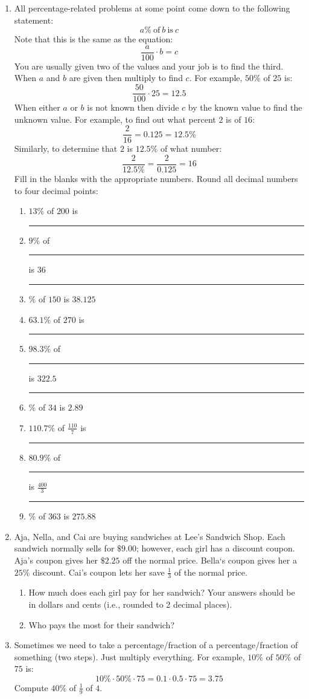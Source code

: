 \documentclass[letterpaper,12pt,fleqn]{article}
\begin{document}
\begin{enumerate}
\item All percentage-related problems at some point come down to the following
  statement:
  \[a\%\ \mbox{of}\ b\ \mbox{is}\ c\]
  Note that this is the same as the equation:
  \[\frac{a}{100}\cdot b=c\]
  You are usually given two of the values and your job is to find the third.
  When $a$ and $b$ are given then multiply to find $c$. For example, $50\%$ of
  $25$ is:
  \[\frac{50}{100}\cdot25=12.5\]
  When either $a$ or $b$ is not known then divide $c$ by the known value to find
  the unknown value. For example, to find out what percent $2$ is of $16$:
  \[\frac{2}{16}=0.125=12.5\%\]
  Similarly, to determine that $2$ is $12.5\%$ of what number:
  \[\frac{2}{12.5\%}=\frac{2}{0.125}=16\]
  Fill in the blanks with the appropriate numbers. Round all decimal numbers to
  four decimal points:
  \begin{enumerate}
  \item $13\%$ of $200$ is \rule{1in}{0.1mm}
  \item $9\%$ of \rule{1in}{0.1mm} is $36$
  \item \rule{1in}{0.1mm}$\%$ of $150$ is $38.125$
  \item $63.1\%$ of $270$ is \rule{1in}{0.1mm}
  \item $98.3\%$ of \rule{1in}{0.1mm} is $322.5$
  \item \rule{1in}{0.1mm}$\%$ of $34$ is $2.89$
  \item $110.7\%$ of $\frac{110}{7}$ is \rule{1in}{0.1mm}
  \item $80.9\%$ of \rule{1in}{0.1mm} is $\frac{400}{3}$
  \item \rule{1in}{0.1mm}$\%$ of $363$ is $275.88$
  \end{enumerate}

\item Aja, Nella, and Cai are buying sandwiches at Lee's Sandwich Shop. Each
  sandwich normally sells for $\$9.00$; however, each girl has a discount
  coupon. Aja's coupon gives her $\$2.25$ off the normal price. Bella`s coupon
  gives her a $25\%$ discount. Cai's coupon lets her save $\frac{1}{3}$ of the
  normal price.
  \begin{enumerate}
  \item How much does each girl pay for her sandwich? Your answers should be
    in dollars and cents (i.e., rounded to 2 decimal places).
  \item Who pays the most for their sandwich?
  \end{enumerate}

\item Sometimes we need to take a percentage/fraction of a percentage/fraction
  of something (two steps). Just multiply everything. For example, $10\%$ of
  $50\%$ of $75$ is: 
  \[10\%\cdot50\%\cdot75=0.1\cdot0.5\cdot75=3.75\]
  Compute $40\%$ of $\frac{1}{9}$ of $4$.


\end{enumerate}
\end{document}
